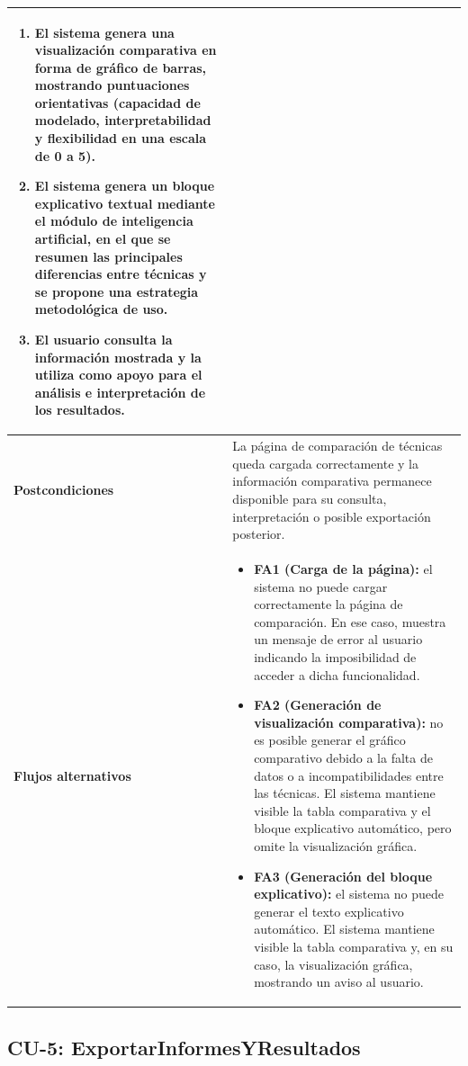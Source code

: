 \begin{longtable}{|p{4cm}|p{10cm}|}
\begin{enumerate}
    \item El sistema genera una visualización comparativa en forma de gráfico de barras, mostrando puntuaciones orientativas (capacidad de modelado, interpretabilidad y flexibilidad en una escala de 0 a 5).
    
    \item El sistema genera un bloque explicativo textual mediante el módulo de inteligencia artificial, en el que se resumen las principales diferencias entre técnicas y se propone una estrategia metodológica de uso.
    
    \item El usuario consulta la información mostrada y la utiliza como apoyo para el análisis e interpretación de los resultados.
\end{enumerate} \\ \hline

\textbf{Postcondiciones} & 
La página de comparación de técnicas queda cargada correctamente y la información comparativa permanece disponible para su consulta, interpretación o posible exportación posterior. \\ \hline

\textbf{Flujos alternativos} & 
\begin{itemize}
    \item \textbf{FA1 (Carga de la página):} el sistema no puede cargar correctamente la página de comparación. En ese caso, muestra un mensaje de error al usuario indicando la imposibilidad de acceder a dicha funcionalidad.
    
    \item \textbf{FA2 (Generación de visualización comparativa):} no es posible generar el gráfico comparativo debido a la falta de datos o a incompatibilidades entre las técnicas. El sistema mantiene visible la tabla comparativa y el bloque explicativo automático, pero omite la visualización gráfica.
    
    \item \textbf{FA3 (Generación del bloque explicativo):} el sistema no puede generar el texto explicativo automático. El sistema mantiene visible la tabla comparativa y, en su caso, la visualización gráfica, mostrando un aviso al usuario.
\end{itemize} \\ \hline

\end{longtable}
    \newpage
    \subsection{CU-5: ExportarInformesYResultados}
    
